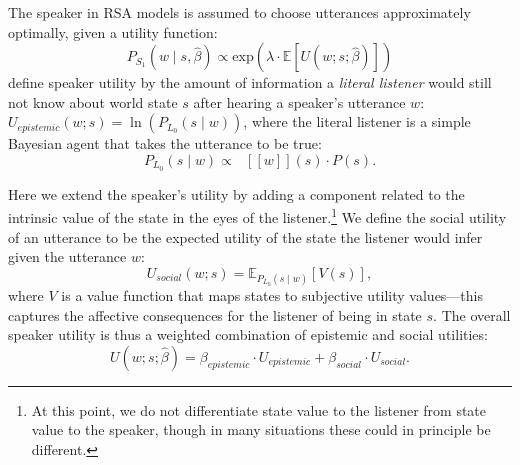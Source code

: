 \documentclass[10pt,letterpaper]{article}
\newcommand{\denote}[1]{\mbox{ $[\![ #1 ]\!]$}}
\newcommand{\ndg}[1]{\textcolor{Green}{[ndg: #1]}}
\begin{document}
The speaker in RSA models is assumed to choose utterances approximately optimally, given a utility function:
\begin{equation}
P_{S_1}(w \mid s, \hat{\beta}) \propto \mathrm{exp}(\lambda \cdot \mathbb{E}[U(w; s;  \hat{\beta})])\label{eq:S1}
\end{equation}
 define speaker utility by the amount of information a \emph{literal listener} would still not know about world state $s$ after hearing a speaker's utterance $w$:
$U_{epistemic}(w; s) = \ln(P_{L_0}(s \mid w)) $,
where the literal listener is a simple Bayesian agent that takes the utterance to be true:
\begin{equation}
P_{L_0}(s \mid w)\propto \denote{w}(s) \cdot P(s) \label{eq:L0}.
\end{equation}

Here we extend the speaker's utility by adding a component related to the intrinsic value of the state in the eyes of the listener.\footnote{At this point, we do not differentiate state value to the listener from state value to the speaker, though in many situations these could in principle be different.}
%
We define the social utility of an utterance to be the expected utility of the state the listener would infer given the utterance $w$:
$$
U_{social}(w; s) = \mathbb{E}_{P_{L_0}(s \mid w)}[V(s)],
$$
%
where $V$ is a value function that maps states to subjective utility values---this captures the affective consequences for the listener of being in state $s$.
The overall speaker utility is thus a weighted combination of epistemic and social utilities:
$$
U(w;s;  \hat{\beta}) = \beta_{epistemic}\cdot U_{epistemic} + \beta_{social} \cdot U_{social}.
$$
%
%
\end{document}

